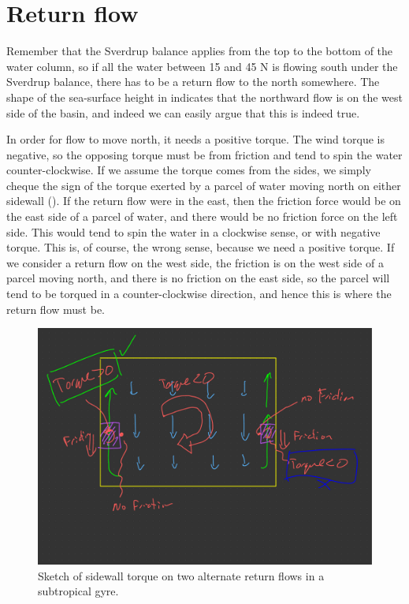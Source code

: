 \section{Return flow}

Remember that the Sverdrup balance applies from the top to the bottom of the water column, so if all the water between 15 and 45 N is flowing south under the Sverdrup balance, there has to be a return flow to the north somewhere.  The shape of the sea-surface height in  indicates that the northward flow is on the west side of the basin, and indeed we can easily argue that this is indeed true.  

In order for flow to move north, it needs a positive torque.  The wind torque is negative, so the opposing torque must be from friction and tend to spin the water counter-clockwise.  If we assume the torque comes from the sides, we simply cheque the sign of the torque exerted by a parcel of water moving north on either sidewall ().  If the return flow were in the east, then the friction force would be on the east side of a parcel of water, and there would be no friction force on the left side.  This would tend to spin the water in a clockwise sense, or with negative torque.  This is, of course, the wrong sense, because we need a positive torque.  If we consider a return flow on the west side, the friction is on the west side of a parcel moving north, and there is no friction on the east side, so the parcel will tend to be torqued in a counter-clockwise direction, and hence this is where the return flow must be.  

\begin{figure}[hbt]
  \begin{center}
    \includegraphics{figs/Sverdrup/TorquesReturn}
    \caption{Sketch of sidewall torque on two alternate return flows in a subtropical gyre.}
    \label{fig:TorquesReturn}  
  \end{center}
\end{figure}

